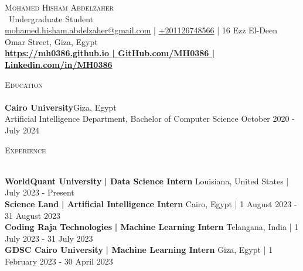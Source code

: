\documentclass[a4paper]{article}
\newcommand{\lineunder} {
    \vspace*{-8pt} \\
    \hspace*{-18pt} \hrulefill \\
}
\newcommand{\header} [1] {
    {\hspace*{-18pt}\vspace*{6pt} \textsc{#1}}
    \vspace*{-6pt} \lineunder
}
\begin{document}
    \vspace*{-40pt}

    

%
%
  \vspace*{-2pt}
  \begin{center}
    {\Huge \scshape {Mohamed Hisham Abdelzaher}}\\
    \vspace*{2pt}
    \ {Undergraduate Student}\\
    \vspace*{2pt}
    \href{mailto:mohamed.hisham.abdelzaher@gmail.com}{mohamed.hisham.abdelzaher@gmail.com} | \href{tel:+201126748566}{+201126748566} | 16 Ezz El-Deen Omar Street, Giza, Egypt\\
    \vspace*{2pt}
    \textbf{\href{https://mh0386.github.io}{https://mh0386.github.io | }}\textbf{\href{https://github.com/MH0386}{GitHub.com/MH0386 | }}\textbf{\href{https://linkedin.com/in/MH0386}{Linkedin.com/in/MH0386}}\\
  \end{center}



      \header{Education}
      \vspace{2mm}
      \textbf{Cairo University}\hfill Giza, Egypt\\
Artificial Intelligence Department, Bachelor of Computer Science \hfill October 2020 - July 2024\\
\vspace{2mm}

%
%
  \header{Experience}
  \vspace{2mm}

  \textbf{WorldQuant University}\textbf{ | Data Science Intern} \hfill Louisiana, United States | July 2023 - Present\\
  \textbf{Science Land}\textbf{ | Artificial Intelligence Intern} \hfill Cairo, Egypt | 1 August 2023 - 31 August 2023\\
  \textbf{Coding Raja Technologies}\textbf{ | Machine Learning Intern} \hfill Telangana, India | 1 July 2023 - 31 July 2023\\
  \textbf{GDSC Cairo University}\textbf{ | Machine Learning Intern} \hfill Giza, Egypt | 1 February 2023 - 30 April 2023\\
\end{document}
